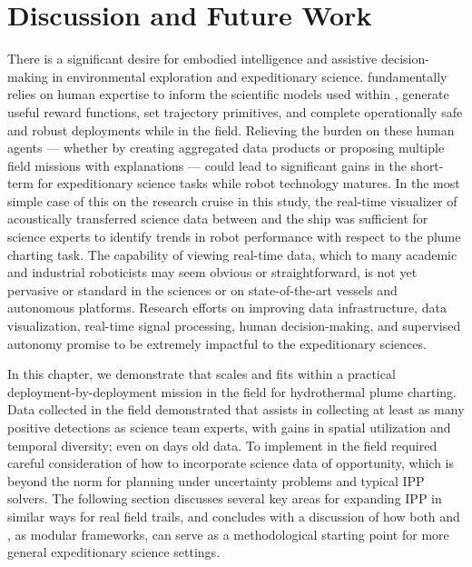 \section{Discussion and Future Work}
\label{sec:future}
There is a significant desire for embodied intelligence and assistive decision-making in environmental exploration and expeditionary science. \PHORTEX fundamentally relies on human expertise to inform the scientific models used within \PHUMES, generate useful reward functions, set trajectory primitives, and complete operationally safe and robust deployments while in the field. Relieving the burden on these human agents --- whether by creating aggregated data products or proposing multiple field missions with explanations --- could lead to significant gains in the short-term for expeditionary science tasks while robot technology matures. In the most simple case of this on the research cruise in this study, the real-time visualizer of acoustically transferred science data between \Sentry and the ship was sufficient for science experts to identify trends in robot performance with respect to the plume charting task. The capability of viewing real-time data, which to many academic and industrial roboticists may seem obvious or straightforward, is not yet pervasive or standard in the sciences or on state-of-the-art vessels and autonomous platforms. Research efforts on improving data infrastructure, data visualization, real-time signal processing, human decision-making, and supervised autonomy promise to be extremely impactful to the expeditionary sciences. 

In this chapter, we demonstrate that \PHORTEX scales and fits within a practical deployment-by-deployment mission in the field for hydrothermal plume charting. Data collected in the field demonstrated that \PHORTEX assists in collecting at least as many positive detections as science team experts, with gains in spatial utilization and temporal diversity; even on days old data. To implement \PHORTEX in the field required careful consideration of how to incorporate science data of opportunity, which is beyond the norm for planning under uncertainty problems and typical IPP solvers. The following section discusses several key areas for expanding IPP in similar ways for real field trails, and concludes with a discussion of how both \PHORTEX and \PHUMES, as modular frameworks, can serve as a methodological starting point for more general expeditionary science settings.


